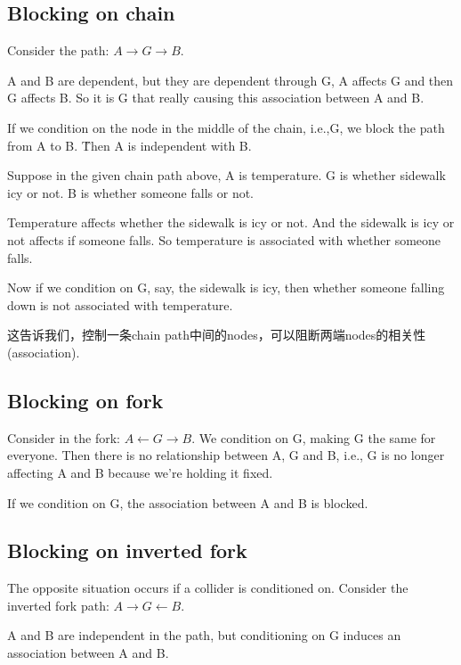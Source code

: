 \subsection{Blocking on chain}
Consider the path: $A \longrightarrow G\longrightarrow B$. 

A and B are dependent, but they are dependent through G, A affects G and then G affects B. So it is G that really causing this association between A and B. 

If we condition on the node in the middle of the chain, i.e.,G, we block the path from A to B. {\r {Then A is independent with B.} }

\begin{ex}
Suppose in the given chain path above,  A is temperature. G is whether sidewalk icy or not. B is whether someone falls or not. 

Temperature affects whether the sidewalk is icy or not. And the sidewalk is icy or not affects if someone falls. So temperature is associated with whether someone falls.

Now if we condition on G, say, the sidewalk is icy, then whether someone falling down is not associated with temperature. 
\end{ex}
这告诉我们，控制一条chain path中间的nodes，可以阻断两端nodes的相关性(association).

\subsection{Blocking on fork}
Consider in the fork: $A \longleftarrow G \longrightarrow B$.
We condition on G, making G the same for everyone. Then there is no relationship between A, G and B, i.e., G is no longer affecting A and B because we're holding it fixed.

If we condition on G, the association between A and B is blocked. 

\subsection{Blocking on inverted fork}
{\color{red} The opposite situation occurs if a collider is conditioned on.}
Consider the inverted fork path: $A \longrightarrow G \longleftarrow B$.

A and B are independent in the path, but conditioning on G induces an association between A and B.

